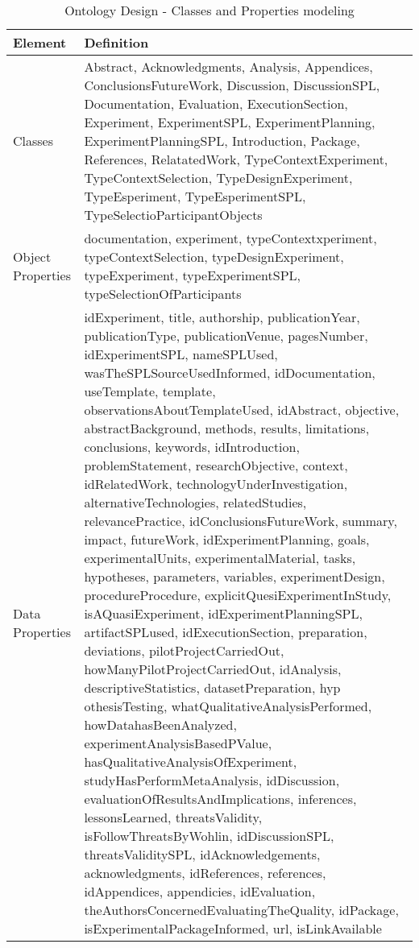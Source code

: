 \begin{table}[htbp]
	\caption{Ontology Design - Classes and Properties modeling}
	\label{tab:ontology_design_classes_properties}
	\centering
	\begin{tabu} to 
		\hline
		\centering \textbf{Element} & \centering \textbf{Definition} \\ \hline
		
		Classes & Abstract, Acknowledgments, Analysis, Appendices, ConclusionsFutureWork, Discussion, DiscussionSPL, Documentation, Evaluation, ExecutionSection, Experiment, ExperimentSPL, ExperimentPlanning, ExperimentPlanningSPL, Introduction, Package, References, RelatatedWork, TypeContextExperiment, TypeContextSelection, TypeDesignExperiment, TypeEsperiment, TypeEsperimentSPL, TypeSelectioParticipantObjects \\ \hline
		
		Object Properties & documentation, experiment, typeContextxperiment, typeContextSelection, typeDesignExperiment, typeExperiment, typeExperimentSPL, typeSelectionOfParticipants \\ \hline
		
		Data \mbox{Properties} & idExperiment, title, authorship, publicationYear, publicationType, publicationVenue, pagesNumber, idExperimentSPL, nameSPLUsed, wasTheSPLSourceUsedInformed, idDocumentation, useTemplate, template, observationsAboutTemplateUsed, idAbstract, objective, abstractBackground, methods, results, limitations, conclusions, keywords, idIntroduction, problemStatement, researchObjective, context, idRelatedWork, technologyUnderInvestigation, alternativeTechnologies, relatedStudies, relevancePractice, idConclusionsFutureWork, summary, impact, futureWork, idExperimentPlanning, goals, experimentalUnits, experimentalMaterial, tasks, hypotheses, parameters, variables, experimentDesign, procedureProcedure, explicitQuesiExperimentInStudy, isAQuasiExperiment, idExperimentPlanningSPL, artifactSPLused, idExecutionSection, preparation, deviations, pilotProjectCarriedOut, howManyPilotProjectCarriedOut, idAnalysis, descriptiveStatistics, datasetPreparation, hyp othesisTesting, whatQualitativeAnalysisPerformed, howDatahasBeenAnalyzed, experimentAnalysisBasedPValue, hasQualitativeAnalysisOfExperiment, studyHasPerformMetaAnalysis, idDiscussion, evaluationOfResultsAndImplications, inferences, lessonsLearned, threatsValidity, isFollowThreatsByWohlin, idDiscussionSPL, threatsValiditySPL, idAcknowledgements, acknowledgments, idReferences, references, idAppendices, appendicies, idEvaluation, theAuthorsConcernedEvaluatingTheQuality, idPackage, isExperimentalPackageInformed, url, isLinkAvailable \\ \hline
	\end{tabu}
\end{table}


